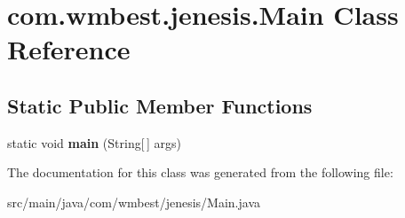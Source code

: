 \hypertarget{classcom_1_1wmbest_1_1jenesis_1_1Main}{\section{com.\-wmbest.\-jenesis.\-Main Class Reference}
\label{classcom_1_1wmbest_1_1jenesis_1_1Main}
}
\subsection*{Static Public Member Functions}
\begin{DoxyCompactItemize}
\item 
\hypertarget{classcom_1_1wmbest_1_1jenesis_1_1Main_abb053ca40dd2eeabb6b0307911ecb75c}{static void {\bfseries main} (String\mbox{[}$\,$\mbox{]} args)}\label{classcom_1_1wmbest_1_1jenesis_1_1Main_abb053ca40dd2eeabb6b0307911ecb75c}

\end{DoxyCompactItemize}


The documentation for this class was generated from the following file\-:\begin{DoxyCompactItemize}
\item 
src/main/java/com/wmbest/jenesis/Main.\-java\end{DoxyCompactItemize}

